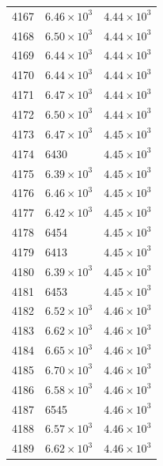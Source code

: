 \begin{table}[H]
\begin{tabular}{lll}
4167 & $\displaystyle 6.46 \times 10^{3}$ & $\displaystyle 4.44 \times 10^{3}$ \\
4168 & $\displaystyle 6.50 \times 10^{3}$ & $\displaystyle 4.44 \times 10^{3}$ \\
4169 & $\displaystyle 6.44 \times 10^{3}$ & $\displaystyle 4.44 \times 10^{3}$ \\
4170 & $\displaystyle 6.44 \times 10^{3}$ & $\displaystyle 4.44 \times 10^{3}$ \\
4171 & $\displaystyle 6.47 \times 10^{3}$ & $\displaystyle 4.44 \times 10^{3}$ \\
4172 & $\displaystyle 6.50 \times 10^{3}$ & $\displaystyle 4.44 \times 10^{3}$ \\
4173 & $\displaystyle 6.47 \times 10^{3}$ & $\displaystyle 4.45 \times 10^{3}$ \\
4174 & 6430 & $\displaystyle 4.45 \times 10^{3}$ \\
4175 & $\displaystyle 6.39 \times 10^{3}$ & $\displaystyle 4.45 \times 10^{3}$ \\
4176 & $\displaystyle 6.46 \times 10^{3}$ & $\displaystyle 4.45 \times 10^{3}$ \\
4177 & $\displaystyle 6.42 \times 10^{3}$ & $\displaystyle 4.45 \times 10^{3}$ \\
4178 & 6454 & $\displaystyle 4.45 \times 10^{3}$ \\
4179 & 6413 & $\displaystyle 4.45 \times 10^{3}$ \\
4180 & $\displaystyle 6.39 \times 10^{3}$ & $\displaystyle 4.45 \times 10^{3}$ \\
4181 & 6453 & $\displaystyle 4.45 \times 10^{3}$ \\
4182 & $\displaystyle 6.52 \times 10^{3}$ & $\displaystyle 4.46 \times 10^{3}$ \\
4183 & $\displaystyle 6.62 \times 10^{3}$ & $\displaystyle 4.46 \times 10^{3}$ \\
4184 & $\displaystyle 6.65 \times 10^{3}$ & $\displaystyle 4.46 \times 10^{3}$ \\
4185 & $\displaystyle 6.70 \times 10^{3}$ & $\displaystyle 4.46 \times 10^{3}$ \\
4186 & $\displaystyle 6.58 \times 10^{3}$ & $\displaystyle 4.46 \times 10^{3}$ \\
4187 & 6545 & $\displaystyle 4.46 \times 10^{3}$ \\
4188 & $\displaystyle 6.57 \times 10^{3}$ & $\displaystyle 4.46 \times 10^{3}$ \\
4189 & $\displaystyle 6.62 \times 10^{3}$ & $\displaystyle 4.46 \times 10^{3}$ \\

\end{tabular}
\end{table}
